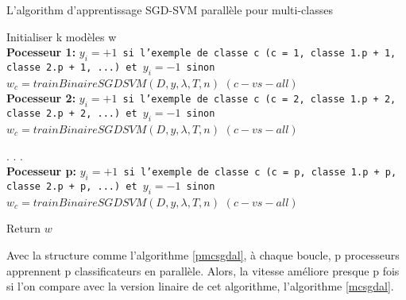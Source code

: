 \begin{algorithm}[H]
\caption{L'algorithm d'apprentissage SGD-SVM parallèle pour multi-classes}\label{pmcsgdal}
\begin{algorithmic}[1]

\State Initialiser k modèles w
\\
\BState \textbf{Pocesseur 1:}
\State \texttt{$y_i = +1$ si l'exemple de classe c (c = 1, classe 1.p + 1, classe 2.p + 1, ...) et $y_i = -1$ sinon}
\State \texttt{$w_c = trainBinaireSGDSVM(D, y, \lambda, T, n)$} $(c-vs-all)$
\\
\BState \textbf{Pocesseur 2:}
\State \texttt{$y_i = +1$ si l'exemple de classe c (c = 2, classe 1.p + 2, classe 2.p + 2, ...) et $y_i = -1$ sinon}
\State \texttt{$w_c = trainBinaireSGDSVM(D, y, \lambda, T, n)$} $(c-vs-all)$

\State .
\State .
\State .
\\
\BState \textbf{Pocesseur p:}
\State \texttt{$y_i = +1$ si l'exemple de classe c (c = p, classe 1.p + p, classe 2.p + p, ...) et $y_i = -1$ sinon}
\State \texttt{$w_c = trainBinaireSGDSVM(D, y, \lambda, T, n)$} $(c-vs-all)$

\BState Return $w$

\EndProcedure
\end{algorithmic}
\end{algorithm}

Avec la structure comme l'algorithme \ref{pmcsgdal}, à chaque boucle, p processeurs apprennent p classificateurs en parallèle. Alors, la vitesse améliore presque p fois si l'on compare avec la version linaire de cet algorithme, l'algorithme \ref{mcsgdal}.


